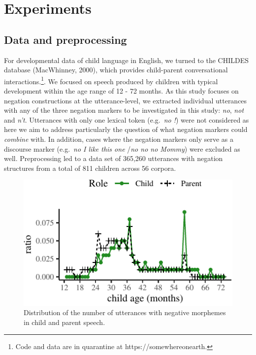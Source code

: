 \documentclass[10pt, letterpaper]{article}
\newenvironment{CodeChunk}{}{}
\begin{document}
\hypertarget{experiments}{%
\section{Experiments}\label{experiments}}

\hypertarget{data-and-preprocessing}{%
\subsection{Data and preprocessing}\label{data-and-preprocessing}}

For developmental data of child language in English, we turned to the
CHILDES database (MacWhinney, 2000), which provides child-parent
conversational
interactions.\footnote{Code and data are in quarantine at https://somewhereonearth.}.
We focused on speech produced by children with typical development
within the age range of 12 - 72 months. As this study focuses on
negation constructions at the utterance-level, we extracted individual
utterances with any of the three negation markers to be investigated in
this study: \emph{no}, \emph{not} and \emph{n't}. Utterances with only
one lexical token (e.g.~\emph{no !}) were not considered as here we aim
to address particularly the question of what negation markers could
\emph{combine} with. In addition, cases where the negation markers only
serve as a discourse marker (e.g.~\emph{no I like this one} /\emph{no no
no Mommy}) were excluded as well. Preprocessing led to a data set of
365,260 utterances with negation structures from a total of 811 children
across 56 corpora.

\begin{CodeChunk}
\begin{figure}[H]

{\centering \includegraphics{figs/speaker_stats-1} 

}

\caption[Distribution of the number of utterances with negative morphemes in child and parent speech]{Distribution of the number of utterances with negative morphemes in child and parent speech.}\label{fig:speaker_stats}
\end{figure}
\end{CodeChunk}
\end{document}
